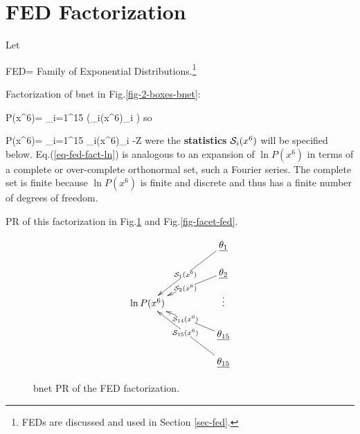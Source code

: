 \section{FED Factorization}

Let

FED= Family of Exponential Distributions.\footnote{FEDs are discussed and used in Section \ref{sec-fed}.}

Factorization  of bnet in Fig.\ref{fig-2-boxes-bnet}:

\beq
P(x^6)=
\prod_{i=1}^{15}
\exp\left(\cals_i(x^6)\theta_i
\right)
\eeq
so

\beq
\ln P(x^6)=
\sum_{i=1}^{15} \cals_i(x^6)\theta_i
-\ln Z
\label{eq-fed-fact-ln}
\eeq
were the {\bf statistics} ${\cal S}_i(x^6)$ will be specified below.
Eq.(\ref{eq-fed-fact-ln})
is analogous to an
 expansion of $\ln P(x^6)$
in terms  of a complete or over-complete orthonormal set, such a Fourier series. The
complete set is finite because
$\ln P(x^6)$ is finite and discrete and thus has a finite number of degrees of freedom.

PR of this factorization in Fig.\ref{fig-bnet-fed} and
Fig.\ref{fig-facet-fed}.
\begin{figure}[h!]
$$
\xymatrix@C=4pc@R=1pc{
&\ul{\theta_1}\ar[ddl]|{\cals_1(x^6)}
\\
&\ul{\theta_2}\ar[dl]|{\cals_2(x^6)}
\\
\ln P(x^6)&\vdots
\\
&\ul{\theta_{15}}\ar[ul]|{\cals_{14}(x^6)}
\\
&\ul{\theta_{15}}\ar[uul]|{\cals_{15}(x^6)}
}$$
\caption{bnet PR of the FED factorization.}
\label{fig-bnet-fed}
\end{figure}


